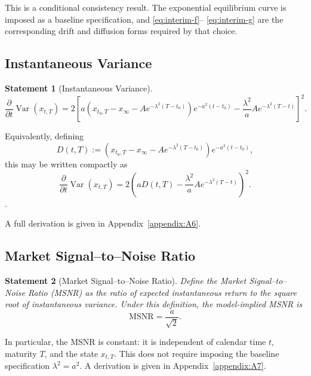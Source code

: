 \documentclass[12pt]{article}
\theoremstyle{statementstyle}
\newtheorem{statement}{Statement}[section]
\begin{document}
This is a conditional consistency result. The exponential equilibrium
curve is imposed as a baseline specification, and \eqref{eq:interim-f}--
\eqref{eq:interim-g} are the corresponding drift and diffusion forms
required by that choice.

\subsection{Instantaneous Variance}

\begin{statement}[Instantaneous Variance]
\label{stmt:interim_inst_variance}
\[
\frac{\partial}{\partial t}\operatorname{Var}(x_{t,T})
=
2\left[
a\left(
x_{t_0,T}
-
x_\infty
-
Ae^{-\lambda^2(T-t_0)}
\right)
e^{-a^2(t-t_0)}
-
\frac{\lambda^2}{a}Ae^{-\lambda^2(T-t)}
\right]^2.
\]
\end{statement}
Equivalently, defining
\[
D(t,T)
:=
\left(
x_{t_0,T}
-
x_\infty
-
Ae^{-\lambda^2(T-t_0)}
\right)
e^{-a^2(t-t_0)},
\]
this may be written compactly as
\[
\frac{\partial}{\partial t}\operatorname{Var}(x_{t,T})
=
2\left(
aD(t,T)
-
\frac{\lambda^2}{a}Ae^{-\lambda^2(T-t)}
\right)^2.
\]. 

A full derivation is given in Appendix~\ref{appendix:A6}.

\subsection{Market Signal--to--Noise Ratio}

\begin{statement}[Market Signal--to--Noise Ratio]
\label{stmt:msnr}
\emph{
Define the Market Signal--to--Noise Ratio (MSNR) as the ratio of expected
instantaneous return to the square root of instantaneous variance. Under this
definition, the model-implied MSNR is
}
\[
\mathrm{MSNR}
=
\frac{a}{\sqrt{2}}.
\tag{3.7.1}
\]
\end{statement}

\medskip

In particular, the MSNR is constant: it is independent of calendar time
\(t\), maturity \(T\), and the state \(x_{t,T}\). This does not require
imposing the baseline specification \(\lambda^{2}=a^{2}\).
A derivation is given in Appendix~\ref{appendix:A7}.
\end{document}
